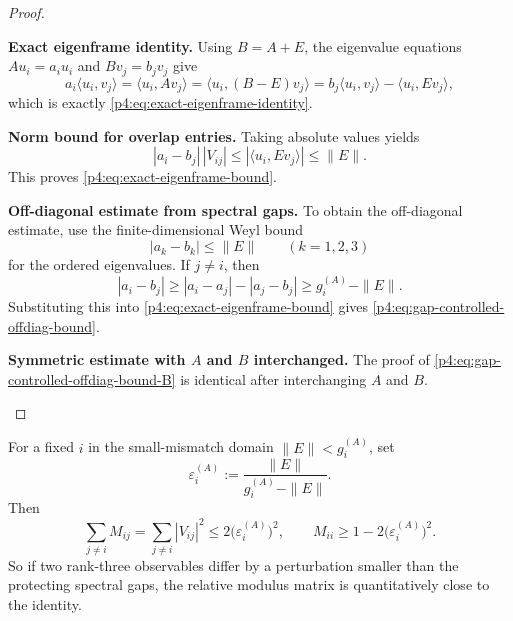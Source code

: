 \documentclass[12pt,a4paper]{article}
\begin{document}
\begin{proof}
\begin{proofsteps}

\item \textbf{Exact eigenframe identity.}
Using $B=A+E$, the eigenvalue equations $Au_i=a_i u_i$ and $Bv_j=b_j v_j$ give
\[
a_i\langle u_i,v_j\rangle
=
\langle u_i,Av_j\rangle
=
\langle u_i,(B-E)v_j\rangle
=
b_j\langle u_i,v_j\rangle - \langle u_i,Ev_j\rangle,
\]
which is exactly \eqref{p4:eq:exact-eigenframe-identity}.

\item \textbf{Norm bound for overlap entries.}
Taking absolute values yields
\[
|a_i-b_j|\,|V_{ij}|
\le
|\langle u_i,Ev_j\rangle|
\le
\|E\|.
\]
This proves \eqref{p4:eq:exact-eigenframe-bound}.


\item \textbf{Off-diagonal estimate from spectral gaps.}
To obtain the off-diagonal estimate, use the finite-dimensional Weyl bound
\[
|a_k-b_k|\le \|E\| \qquad (k=1,2,3)
\]
for the ordered eigenvalues.
If $j\neq i$, then
\[
|a_i-b_j|
\ge
|a_i-a_j|-|a_j-b_j|
\ge
g_i^{(A)}-\|E\|.
\]
Substituting this into \eqref{p4:eq:exact-eigenframe-bound} gives \eqref{p4:eq:gap-controlled-offdiag-bound}.

\item \textbf{Symmetric estimate with \(A\) and \(B\) interchanged.}
The proof of \eqref{p4:eq:gap-controlled-offdiag-bound-B} is identical after interchanging $A$ and $B$.
\end{proofsteps}

\end{proof}

\begin{corollary}
\label{p4:cor:near-identity-modulus-matrix}
For a fixed $i$ in the small-mismatch domain $\|E\|<g_i^{(A)}$, set
\[
\varepsilon_i^{(A)}:=\frac{\|E\|}{g_i^{(A)}-\|E\|}.
\]
Then
\begin{equation}
\label{p4:eq:near-identity-row-bound}
\sum_{j\neq i} M_{ij}
=
\sum_{j\neq i}|V_{ij}|^2
\le
2\bigl(\varepsilon_i^{(A)}\bigr)^2,
\qquad
M_{ii}\ge 1-2\bigl(\varepsilon_i^{(A)}\bigr)^2.
\end{equation}
So if two rank-three observables differ by a perturbation smaller than the protecting spectral gaps, the relative modulus matrix is quantitatively close to the identity.
\end{corollary}
\end{document}
